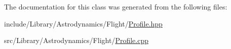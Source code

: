 The documentation for this class was generated from the following files\+:\begin{DoxyCompactItemize}
\item 
include/\+Library/\+Astrodynamics/\+Flight/\hyperlink{_profile_8hpp}{Profile.\+hpp}\item 
src/\+Library/\+Astrodynamics/\+Flight/\hyperlink{_profile_8cpp}{Profile.\+cpp}\end{DoxyCompactItemize}
